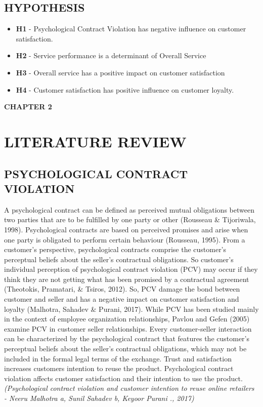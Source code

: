 \documentclass[a4paper, 12pt]{extarticle}
\begin{document}
{\subsection{HYPOTHESIS}
\begin{itemize}
\item \textbf{H1} - Psychological Contract Violation has negative influence on customer satisfaction.
\item \textbf{H2} - Service performance is a determinant of Overall Service
\item \textbf{H3} - Overall service has a positive impact on customer satisfaction
\item \textbf{H4} - Customer satisfaction has positive influence on customer loyalty.
\end{itemize}

\newpage
\begin{center}
\textbf{\large CHAPTER 2}
\end{center}
\section{LITERATURE REVIEW}
\subsection{PSYCHOLOGICAL CONTRACT VIOLATION}
\par A psychological contract can be defined as perceived mutual obligations between two parties that are to be fulfilled by one party or other (Rousseau \& Tijoriwala, 1998). Psychological contracts are based on perceived promises and arise when one party is obligated to perform certain behaviour (Rousseau, 1995). From a customer's perspective, psychological contracts comprise the customer's perceptual beliefs about the seller's contractual obligations. So customer's individual perception of psychological contract violation (PCV) may occur if they think they are not getting what has been promised by a contractual agreement (Theotokis, Pramatari, \& Tsiros, 2012). So, PCV damage the bond between customer and seller and has a negative impact on customer satisfaction and loyalty (Malhotra, Sahadev \& Purani, 2017). While PCV has been studied mainly in the context of employee organization relationships, Pavlou and Gefen (2005) examine PCV in customer seller relationships. Every customer-seller interaction can be characterized by the psychological contract that features the customer's perceptual beliefs about the seller's contractual obligations, which may not be included in the formal legal terms of the exchange. Trust and satisfaction increases customers intention to reuse the product. Psychological contract violation affects customer satisfaction and their intention to use the product. \emph{(Psychological contract violation and customer intention to reuse online retailers - Neeru Malhotra a, Sunil Sahadev b, Keyoor Purani ., 2017)}


}
\end{document}
